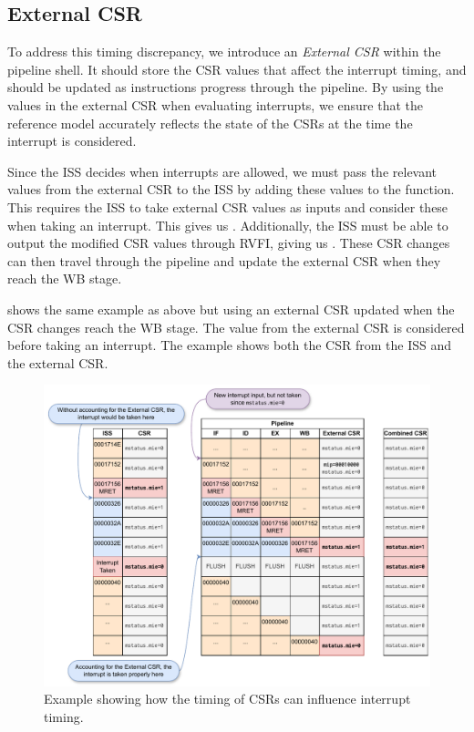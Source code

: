 \subsection{External CSR}

To address this timing discrepancy, we introduce an \textit{External CSR} within the pipeline shell. It should store the CSR values that affect the interrupt timing, and should be updated as instructions progress through the pipeline. By using the values in the external CSR when evaluating interrupts, we ensure that the reference model accurately reflects the state of the CSRs at the time the interrupt is considered.

Since the ISS decides when interrupts are allowed, we must pass the relevant values from the external CSR to the ISS by adding these values to the  function. This requires the ISS to take external CSR values as inputs and consider these when taking an interrupt. This gives us \textbf{}. Additionally, the ISS must be able to output the modified CSR values through RVFI, giving us \textbf{}.
These CSR changes can then travel through the pipeline and update the external CSR when they reach the WB stage.


 shows the same example as above but using an external CSR updated when the CSR changes reach the WB stage. The value from the external CSR is considered before taking an interrupt. The example shows both the CSR from the ISS and the external CSR.

\begin{figure}
    \centering
    \includegraphics[width=1\linewidth]{figures/mret_example.pdf}
    \caption{Example showing how the timing of CSRs can influence interrupt timing.}
    \label{fig:mret_example}
\end{figure}

